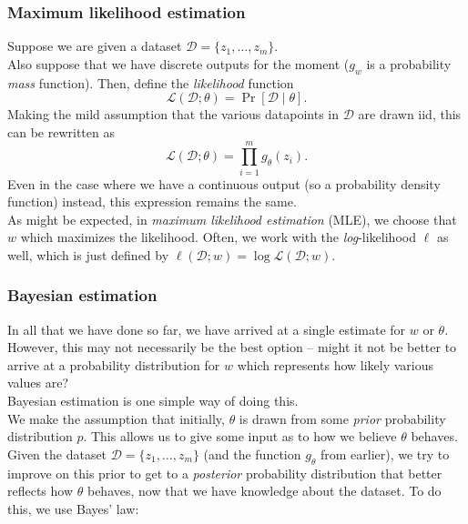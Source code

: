 \documentclass{article}
\begin{document}


		\subsubsection{Maximum likelihood estimation}

			Suppose we are given a dataset $\mathcal{D} = \{z_1,\ldots,z_m\}$.\\
			Also suppose that we have discrete outputs for the moment ($g_w$ is a probability \emph{mass} function). Then, define the \emph{likelihood} function
			\[ \mathcal{L}(\mathcal{D};\theta) = \Pr[ \mathcal{D} \mid \theta ]. \]
			Making the mild assumption that the various datapoints in $\mathcal{D}$ are drawn iid, this can be rewritten as
			\[ \mathcal{L}(\mathcal{D};\theta) = \prod_{i=1}^m g_\theta(z_i). \]
			Even in the case where we have a continuous output (so a probability density function) instead, this expression remains the same.\\
			As might be expected, in \emph{maximum likelihood estimation} (MLE), we choose that $w$ which maximizes the likelihood. Often, we work with the \emph{log}-likelihood $\ell$ as well, which is just defined by $\ell(\mathcal{D};w) = \log \mathcal{L}(\mathcal{D};w)$.

		\subsubsection{Bayesian estimation}

			In all that we have done so far, we have arrived at a single estimate for $w$ or $\theta$. However, this may not necessarily be the best option -- might it not be better to arrive at a probability distribution for $w$ which represents how likely various values are?\\
			Bayesian estimation is one simple way of doing this.\\

			We make the assumption that initially, $\theta$ is drawn from some \emph{prior} probability distribution $p$. This allows us to give some input as to how we believe $\theta$ behaves. Given the dataset $\mathcal{D} = \{z_1,\ldots,z_m\}$ (and the function $g_\theta$ from earlier), we try to improve on this prior to get to a \emph{posterior} probability distribution that better reflects how $\theta$ behaves, now that we have knowledge about the dataset. To do this, we use Bayes' law:
\end{document}
